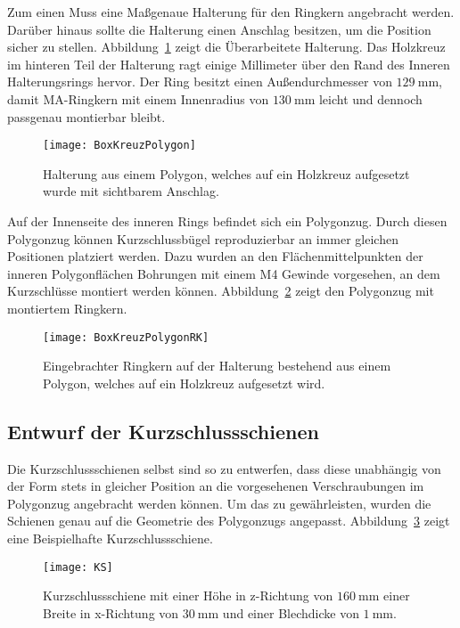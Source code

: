 \newpage



Zum einen Muss eine Ma\ss{}genaue Halterung f\"ur den Ringkern angebracht werden. Dar\"uber hinaus sollte die Halterung einen Anschlag besitzen, um die Position sicher zu stellen. Abbildung~\ref{fig:BoxKreuzPolygon} zeigt die \"Uberarbeitete Halterung. Das Holzkreuz im hinteren Teil der Halterung ragt einige Millimeter \"uber den Rand des Inneren Halterungsrings hervor. Der Ring besitzt einen Au\ss{}endurchmesser von $\SI{129}{\milli\meter}$, damit MA-Ringkern mit einem Innenradius von $\SI{130}{\milli\meter}$ leicht und dennoch passgenau montierbar bleibt.

\begin{figure}[htb]
	\centering
	\texttt{[image: BoxKreuzPolygon]}
	\caption{Halterung aus einem Polygon, welches auf ein Holzkreuz aufgesetzt wurde mit sichtbarem Anschlag.}
	\label{fig:BoxKreuzPolygon}
\end{figure}

Auf der Innenseite des inneren Rings befindet sich ein Polygonzug. Durch diesen Polygonzug k\"onnen Kurzschlussb\"ugel reproduzierbar an immer gleichen Positionen platziert werden. Dazu wurden an den Fl\"achenmittelpunkten der inneren Polygonfl\"achen Bohrungen mit einem M4 Gewinde vorgesehen, an dem Kurzschl\"usse montiert werden k\"onnen. Abbildung~\ref{fig:BoxKreuzPolygonRK} zeigt den Polygonzug mit montiertem Ringkern.

\begin{figure}[htb]
	\centering
	\texttt{[image: BoxKreuzPolygonRK]}
	\caption{Eingebrachter Ringkern auf der Halterung bestehend aus einem Polygon, welches auf ein Holzkreuz aufgesetzt wird.}
	\label{fig:BoxKreuzPolygonRK}
\end{figure}


\newpage



\subsection{Entwurf der Kurzschlussschienen}
\label{sec:shorts}
Die Kurzschlussschienen selbst sind so zu entwerfen, dass diese unabh\"angig von der Form stets in gleicher Position an die vorgesehenen Verschraubungen im Polygonzug angebracht werden k\"onnen. Um das zu gew\"ahrleisten, wurden die Schienen genau auf die Geometrie des Polygonzugs angepasst. Abbildung~\ref{fig:TZKS} zeigt eine Beispielhafte Kurzschlussschiene.
\par
\begin{figure}[htb]
	\centering
	\texttt{[image: KS]}
	\caption{Kurzschlussschiene mit einer H\"ohe in z-Richtung von $\SI{160}{\milli\meter}$ einer Breite in x-Richtung von $\SI{30}{\milli\meter}$ und einer Blechdicke von $\SI{1}{\milli\meter}$.}
	\label{fig:TZKS}
\end{figure}


